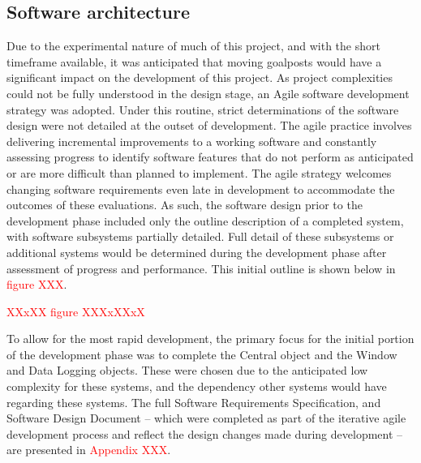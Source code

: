\documentclass[main.tex]{subfiles}
\begin{document}
\subsection{Software architecture}
Due to the experimental nature of much of this project, and with the short timeframe available, it was anticipated that moving goalposts would have a significant impact on the development of this project. As project complexities could not be fully understood in the design stage, an Agile software development strategy was adopted. Under this routine, strict determinations of the software design were not detailed at the outset of development. The agile practice involves delivering incremental improvements to a working software and constantly assessing progress to identify software features that do not perform as anticipated or are more difficult than planned to implement. The agile strategy welcomes changing software requirements even late in development to accommodate the outcomes of these evaluations.
As such, the software design prior to the development phase included only the outline description of a completed system, with software subsystems partially detailed. Full detail of these subsystems or additional systems would be determined during the development phase after assessment of progress and performance. This initial outline is shown below in \textcolor{red}{figure XXX}.

\textcolor{red}{XXxXX figure XXXxXXxX}

To allow for the most rapid development, the primary focus for the initial portion of the development phase was to complete the Central object and the Window and Data Logging objects. These were chosen due to the anticipated low complexity for these systems, and the dependency other systems would have regarding these systems. The full Software Requirements Specification, and Software Design Document – which were completed as part of the iterative agile development process and reflect the design changes made during development – are presented in \textcolor{red}{Appendix XXX}.
\end{document}
